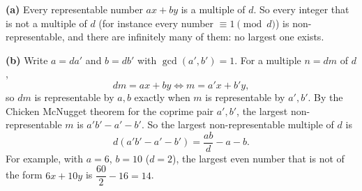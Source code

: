 \textbf{(a)} Every representable number $ax+by$ is a multiple of $d$. So every integer that is not a multiple of $d$ (for instance every number $\equiv1\pmod d$) is non-representable, and there are infinitely many of them: no largest one exists.

\textbf{(b)} Write $a=da'$ and $b=db'$ with $\gcd(a',b')=1$. For a multiple $n=dm$ of $d$,
\[
dm=ax+by\iff m=a'x+b'y ,
\]
so $dm$ is representable by $a,b$ exactly when $m$ is representable by $a',b'$. By the Chicken McNugget theorem for the coprime pair $a',b'$, the largest non-representable $m$ is $a'b'-a'-b'$. So the largest non-representable multiple of $d$ is
\[
d(a'b'-a'-b')=\dfrac{ab}{d}-a-b .
\]
For example, with $a=6$, $b=10$ ($d=2$), the largest even number that is not of the form $6x+10y$ is $\dfrac{60}{2}-16=14$.
